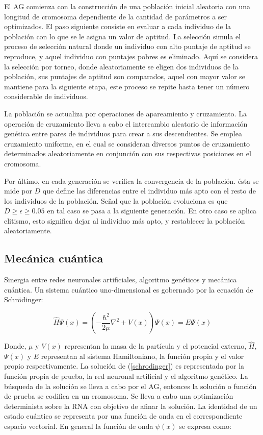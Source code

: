 El AG comienza con la construcci\'on de una poblaci\'on
inicial aleatoria con una longitud de cromosoma dependiente
de la cantidad de par\'ametros a ser optimizados. El paso
siguiente consiste en evaluar a cada individuo de la poblaci\'on
con lo que se le asigna un valor de aptitud. La selecci\'on simula
el proceso de selecci\'on natural donde un individuo con alto
puntaje de aptitud se reproduce, y aquel individuo con puntajes
pobres es eliminado. Aqu\'i se considera la selecci\'on por
torneo, donde aleatoriamente se eligen dos individuos de la
poblaci\'on, sus puntajes de aptitud son comparados, aquel con
mayor valor se mantiene para la siguiente etapa, este proceso
se repite hasta tener un n\'umero considerable de individuos.

La poblaci\'on se actualiza por operaciones de apareamiento
y cruzamiento. La operaci\'on de cruzamiento lleva a cabo
el intercambio aleatorio de informaci\'on gen\'etica entre pares
de individuos para crear a sus descendientes. Se emplea cruzamiento
uniforme, en el cual se consideran diversos puntos
de cruzamiento determinados aleatoriamente en conjunci\'on
con sus respectivas posiciones en el cromosoma.

Por \'ultimo, en cada generaci\'on se verifica la convergencia
de la poblaci\'on. \'esta se mide por $D$ que define las diferencias
entre el individuo m\'as apto con el resto de los individuos
de la poblaci\'on. Se\~nal que la poblaci\'on evoluciona es que
$D\geq\epsilon\geq0.05$ en tal caso se pasa a la siguiente generaci\'on.
En otro caso se aplica elitismo, esto significa dejar al individuo
m\'as apto, y restablecer la poblaci\'on aleatoriamente.

\subsection{Mec\'anica cu\'antica}

Sinergia entre redes neuronales artificiales, algoritmo
gen\'eticos y mec\'anica cu\'antica. Un sistema cu\'antico
uno-dimensional es gobernado por la ecuaci\'on de Schr\"odinger:

\begin{equation}
	\widehat{H}\Psi(x)=(-\frac{\hbar^2}{2\mu}\nabla^2+V(x))\Psi(x)=E\Psi(x)
	\label{schrodinger}
\end{equation}

Donde, $\mu$ y $V(x)$ representan la masa de la part\'icula y el
potencial externo, $\widehat{H}$, $\Psi(x)$ y $E$ representan al sistema
Hamiltoniano, la funci\'on propia y el valor propio respectivamente.
La soluci\'on de (\ref{schrodinger}) es representada por la funci\'on
propia de prueba, la red neuronal artificial y el algoritmo
gen\'etico. La b\'usqueda de la soluci\'on se lleva a cabo por el
AG, entonces la soluci\'on o funci\'on de prueba se codifica en
un cromosoma. Se lleva a cabo una optimizaci\'on determinista
sobre la RNA con objetivo de afinar la soluci\'on. La identidad
de un estado cu\'antico se representa por una funci\'on de onda
en el correspondiente espacio vectorial. En general la funci\'on
de onda $\psi(x)$ se expresa como: 

